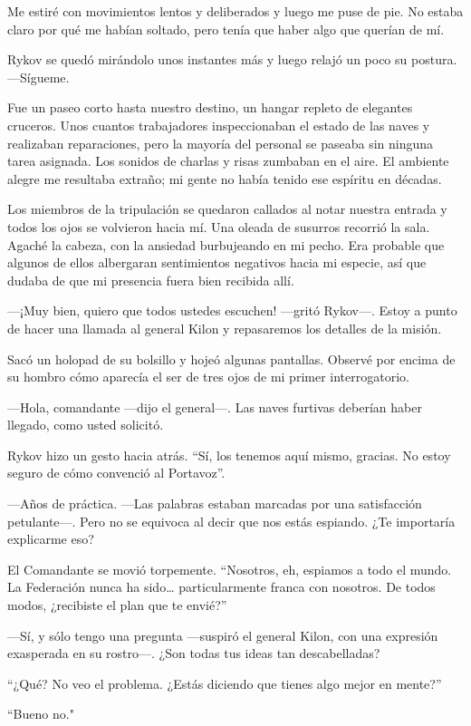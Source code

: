 Me estiré con movimientos lentos y deliberados y luego me puse de pie. No estaba claro por qué me habían soltado, pero tenía que haber algo que querían de mí.

Rykov se quedó mirándolo unos instantes más y luego relajó un poco su postura. —Sígueme.

Fue un paseo corto hasta nuestro destino, un hangar repleto de elegantes cruceros. Unos cuantos trabajadores inspeccionaban el estado de las naves y realizaban reparaciones, pero la mayoría del personal se paseaba sin ninguna tarea asignada. Los sonidos de charlas y risas zumbaban en el aire. El ambiente alegre me resultaba extraño; mi gente no había tenido ese espíritu en décadas.

Los miembros de la tripulación se quedaron callados al notar nuestra entrada y todos los ojos se volvieron hacia mí. Una oleada de susurros recorrió la sala. Agaché la cabeza, con la ansiedad burbujeando en mi pecho. Era probable que algunos de ellos albergaran sentimientos negativos hacia mi especie, así que dudaba de que mi presencia fuera bien recibida allí.

—¡Muy bien, quiero que todos ustedes escuchen! —gritó Rykov—. Estoy a punto de hacer una llamada al general Kilon y repasaremos los detalles de la misión.

Sacó un holopad de su bolsillo y hojeó algunas pantallas. Observé por encima de su hombro cómo aparecía el ser de tres ojos de mi primer interrogatorio.

—Hola, comandante —dijo el general—. Las naves furtivas deberían haber llegado, como usted solicitó.

Rykov hizo un gesto hacia atrás. “Sí, los tenemos aquí mismo, gracias. No estoy seguro de cómo convenció al Portavoz”.

—Años de práctica. —Las palabras estaban marcadas por una satisfacción petulante—. Pero no se equivoca al decir que nos estás espiando. ¿Te importaría explicarme eso?

El Comandante se movió torpemente. “Nosotros, eh, espiamos a todo el mundo. La Federación nunca ha sido… particularmente franca con nosotros. De todos modos, ¿recibiste el plan que te envié?”

—Sí, y sólo tengo una pregunta —suspiró el general Kilon, con una expresión exasperada en su rostro—. ¿Son todas tus ideas tan descabelladas?

“¿Qué? No veo el problema. ¿Estás diciendo que tienes algo mejor en mente?”

``Bueno no."

